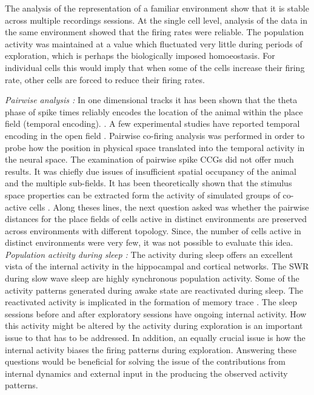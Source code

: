 The analysis of the representation of a familiar environment show that it is stable across multiple recordings sessions. At the single cell level, analysis of the data in the same environment showed that the firing rates were reliable. The population activity was maintained at a value which fluctuated very little during periods of exploration, which is perhaps the biologically imposed homoeostasis. For individual cells this would imply that when some of the cells increase their firing rate, other cells are forced to reduce their firing rates. 

\emph{Pairwise analysis : }
In one dimensional tracks it has been shown that the theta phase of spike times reliably encodes the location of the animal within the place field (temporal encoding). \cite{O'Keefe1993, Skaggs1996c, Huxter2003}. A few experimental studies have reported temporal encoding in the open field \cite{Huxter2008a}. Pairwise co-firing analysis was performed in order to probe how the position in physical space translated into the temporal activity in the neural space. The examination of pairwise spike CCGs did not offer much results. It was chiefly due issues of insufficient spatial occupancy of the animal and the multiple sub-fields. It has been theoretically shown that the stimulus space properties can be extracted form the activity of simulated groups of co-active cells \cite{Curto2008}. Along theses lines, the next question asked was whether the pairwise distances for the place fields of cells active in distinct environments are preserved across environments with different topology. Since, the number of cells active in distinct environments were very few, it was not possible to evaluate this idea. \\

\emph{Population activity during sleep : }
The activity during sleep offers an excellent vista of the internal activity in the hippocampal and cortical networks. The SWR during slow wave sleep are highly synchronous population activity. Some of the activity patterns generated during awake state are reactivated during sleep. The reactivated activity is implicated in the formation of memory trace \cite{Buzsaki1989}. The sleep sessions before and after exploratory sessions have ongoing internal activity. How this activity might be altered by the activity during exploration is an important issue to that has to be addressed. In addition, an equally crucial issue is how the internal activity biases the firing patterns during exploration. Answering these questions would be beneficial for solving the issue of the contributions from internal dynamics and external input in the producing the observed activity patterns.  \\

